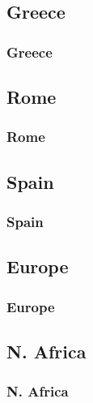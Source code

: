 \subsection{Greece}
\begin{frame}\frametitle{Greece}\logoEvolution

\end{frame}


\subsection{Rome}
\begin{frame}\frametitle{Rome}\logoEvolution

\end{frame}


\subsection{Spain}
\begin{frame}\frametitle{Spain}\logoEvolution

\end{frame}

\subsection{Europe}
\begin{frame}\frametitle{Europe}\logoEvolution

\end{frame}

\subsection{N. Africa}
\begin{frame}\frametitle{N. Africa}\logoEvolution

\end{frame}


